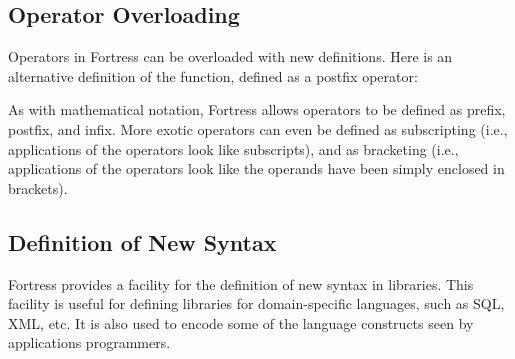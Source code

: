 \subsection{Operator Overloading}
Operators in Fortress can be overloaded with new definitions.
Here is an alternative definition of the  function, defined as a postfix operator:



As with mathematical notation, Fortress allows operators to be defined as prefix, postfix,
and infix. More exotic operators can even be defined as subscripting (i.e., applications of the
operators look like subscripts), and as bracketing (i.e., applications of the operators
look like the operands have been simply enclosed in brackets).

\subsection{Definition of New Syntax}
Fortress provides a facility for the definition of new syntax in libraries.
This facility is useful for defining libraries for domain-specific languages,
such
as SQL, XML, etc.
It is also used to encode some of
the language constructs seen by applications
programmers.
